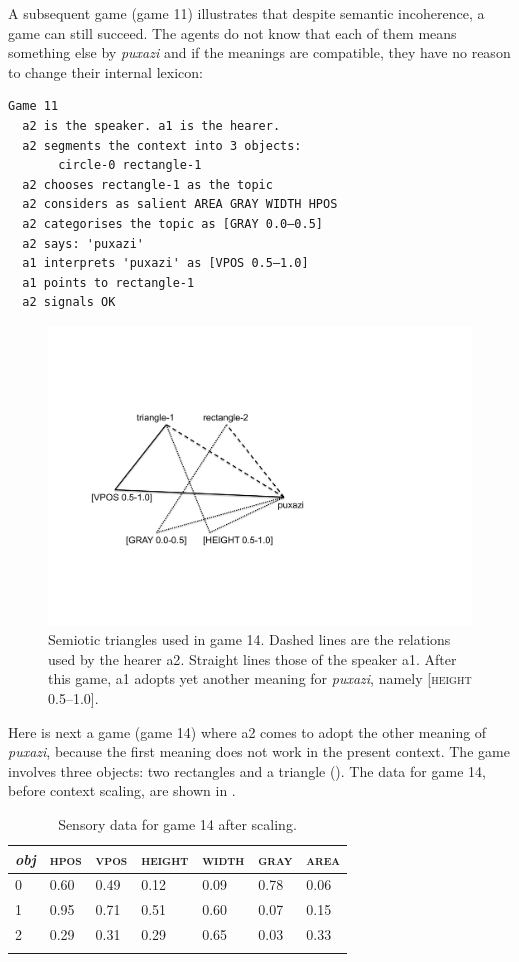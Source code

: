 A subsequent game (game 11) illustrates that despite 
semantic incoherence, a game can still succeed. The agents 
do not know that each of them means something else by 
\textit{puxazi} and if the meanings are compatible, they 
have no reason to change their internal lexicon:
\newpage 

\begin{verbatim}
Game 11
  a2 is the speaker. a1 is the hearer. 
  a2 segments the context into 3 objects: 
       circle-0 rectangle-1
  a2 chooses rectangle-1 as the topic 
  a2 considers as salient AREA GRAY WIDTH HPOS 
  a2 categorises the topic as [GRAY 0.0–0.5]
  a2 says: 'puxazi'
  a1 interprets 'puxazi' as [VPOS 0.5–1.0]
  a1 points to rectangle-1
  a2 signals OK 
\end{verbatim}



\begin{figure}[htbp]
  \centerline{\includegraphics[width=.60\textwidth]{chap6/figs/triangle3.pdf}}
\caption{\label{triangle3}Semiotic triangles used in
game 14. Dashed lines are the relations used by 
the hearer {\bfshape  a2}. Straight lines those of the 
speaker {\bfshape  a1}. After this game, {\bfshape  a1}
adopts yet another meaning for \textit{puxazi}, namely 
{}[\textsc{height} 0.5–1.0].}
\end{figure}
Here is next a game (game 14) where {\bfshape  a2} comes to adopt 
the other meaning of \textit{puxazi}, because the first
meaning does not work in the present context. 
The game involves three objects: two rectangles and a 
triangle ().
The data for game 14, before context scaling, are
shown in . 


\begin{table}
\begin{center}
\begin{tabular}{ l  l  l  l  l  l  l }
\lsptoprule
{\itshape obj} & \textsc{hpos} & \textsc{vpos} & \textsc{height} & \textsc{width} & \textsc{gray} & \textsc{area} \\ \midrule
0 & 0.60 & 0.49 & 0.12 & 0.09 & 0.78 & 0.06\\ 
1 & 0.95 & 0.71 & 0.51 & 0.60 & 0.07 & 0.15\\ 
2 & 0.29 & 0.31 & 0.29 & 0.65 & 0.03 & 0.33\\ 
\lspbottomrule
\end{tabular}
\caption{\label{tab:game14}Sensory data for game 14 after scaling.}
\end{center}
\end{table}

